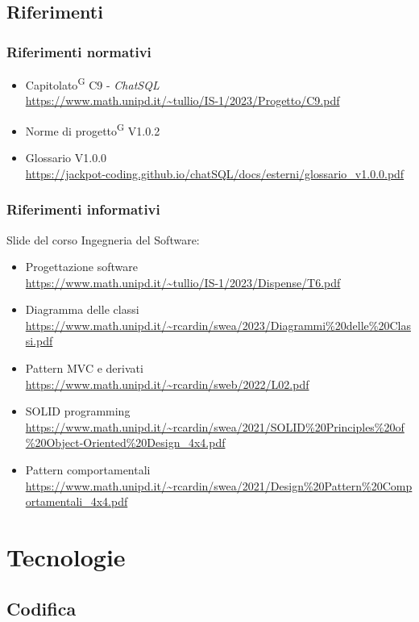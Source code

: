 \documentclass[5pt]{article}
\begin{document}
	\subsection{Riferimenti}
	\subsubsection{Riferimenti normativi}
	\begin{itemize}
		\item Capitolato\textsuperscript{G} C9 - \textit{ChatSQL} \\ \url{https://www.math.unipd.it/~tullio/IS-1/2023/Progetto/C9.pdf}
		\item Norme di progetto\textsuperscript{G} V1.0.2
		\item Glossario V1.0.0 \\
		\url{https://jackpot-coding.github.io/chatSQL/docs/esterni/glossario_v1.0.0.pdf}
	\end{itemize}
	\subsubsection{Riferimenti informativi}
	Slide del corso Ingegneria del Software:
	\begin{itemize}
		\item Progettazione software \\
		\url{https://www.math.unipd.it/~tullio/IS-1/2023/Dispense/T6.pdf}
		\item Diagramma delle classi \\
		\url{https://www.math.unipd.it/~rcardin/swea/2023/Diagrammi%20delle%20Classi.pdf}
		\item Pattern MVC e derivati \\
		\url{https://www.math.unipd.it/~rcardin/sweb/2022/L02.pdf}
		\item SOLID programming \\
		\url{https://www.math.unipd.it/~rcardin/swea/2021/SOLID%20Principles%20of%20Object-Oriented%20Design_4x4.pdf}
		\item Pattern comportamentali \\
		\url{https://www.math.unipd.it/~rcardin/swea/2021/Design%20Pattern%20Comportamentali_4x4.pdf}
	\end{itemize}
	
	\section{Tecnologie}
	
	\subsection{Codifica}
\end{document}

